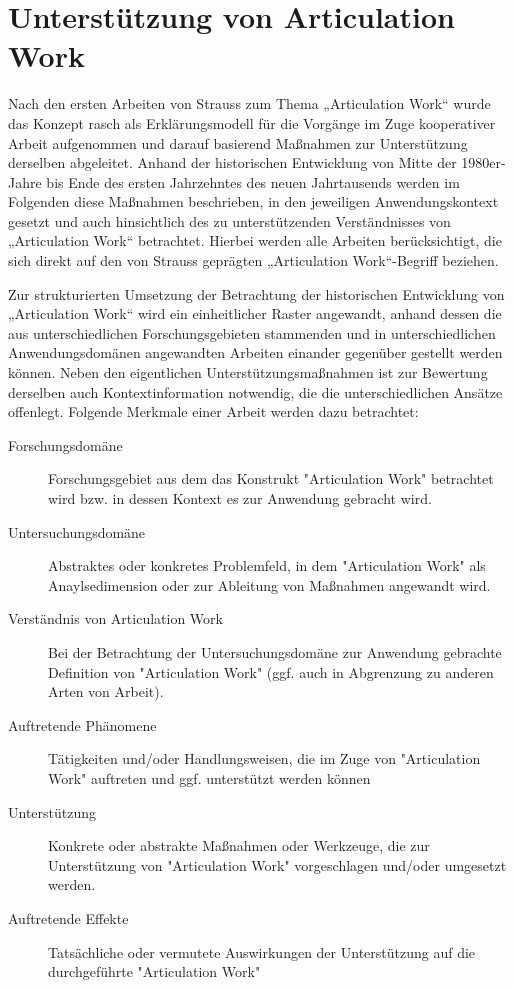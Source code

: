 \section{Unterstützung von Articulation Work} %
\label{sec:unterstützung_von_articulation_work}

Nach den ersten Arbeiten von Strauss zum Thema „Articulation Work“ wurde das Konzept rasch als Erklärungsmodell für die Vorgänge im Zuge kooperativer Arbeit aufgenommen und darauf basierend Maßnahmen zur Unterstützung derselben abgeleitet. Anhand der historischen Entwicklung von Mitte der 1980er-Jahre bis Ende des ersten Jahrzehntes des neuen Jahrtausends werden im Folgenden diese Maßnahmen beschrieben, in den jeweiligen Anwendungskontext gesetzt und auch hinsichtlich des zu unterstützenden Verständnisses von „Articulation Work“ betrachtet. Hierbei werden alle Arbeiten berücksichtigt, die sich direkt auf den von Strauss geprägten „Articulation Work“-Begriff beziehen.

Zur strukturierten Umsetzung der Betrachtung der historischen Entwicklung von „Articulation Work“ wird ein einheitlicher Raster angewandt, anhand dessen die aus unterschiedlichen Forschungsgebieten stammenden und in unterschiedlichen Anwendungsdomänen angewandten Arbeiten einander gegenüber gestellt werden können. Neben den eigentlichen Unterstützungsmaßnahmen ist zur Bewertung derselben auch Kontextinformation notwendig, die die unterschiedlichen Ansätze offenlegt. Folgende Merkmale einer Arbeit werden dazu betrachtet:
\begin{description}
 \item[Forschungsdomäne] Forschungsgebiet aus dem das Konstrukt "Articulation Work" betrachtet wird bzw. in dessen Kontext es zur Anwendung gebracht wird.
 \item[Untersuchungsdomäne] Abstraktes oder konkretes Problemfeld, in dem "Articulation Work" als Anaylsedimension oder zur Ableitung von Maßnahmen angewandt wird.
 \item[Verständnis von Articulation Work] Bei der Betrachtung der Untersuchungsdomäne zur Anwendung gebrachte Definition von "Articulation Work" (ggf. auch in Abgrenzung zu anderen Arten von Arbeit).
 \item[Auftretende Phänomene] Tätigkeiten und/oder Handlungsweisen, die im Zuge von "Articulation Work" auftreten und ggf. unterstützt werden können
 \item[Unterstützung] Konkrete oder abstrakte Maßnahmen oder Werkzeuge, die zur Unterstützung von "Articulation Work" vorgeschlagen und/oder umgesetzt werden.
 \item[Auftretende Effekte] Tatsächliche oder vermutete Auswirkungen der Unterstützung auf die durchgeführte "Articulation Work"
\end{description}

